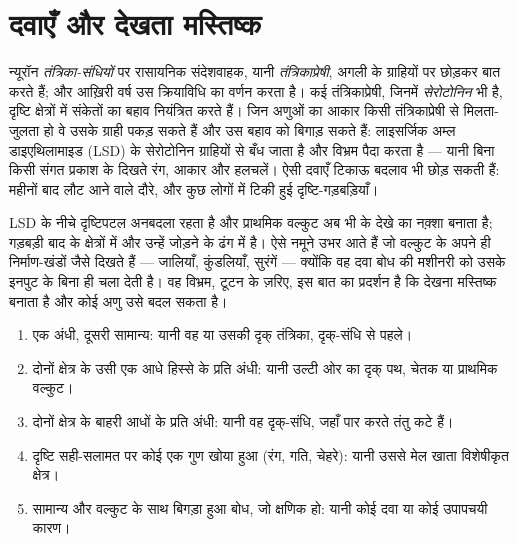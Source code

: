 \section{दवाएँ और देखता मस्तिष्क}

\begin{proposition}\label{prop:g11:vision-and-brain:drugs}
न्यूरॉन \emph{तंत्रिका-संधियों} पर रासायनिक संदेशवाहक, यानी
\emph{तंत्रिकाप्रेषी}, अगली  के ग्राहियों पर छोड़कर बात करते हैं; और
आख़िरी वर्ष उस क्रियाविधि का वर्णन करता है। कई तंत्रिकाप्रेषी, जिनमें
\emph{सेरोटोनिन} भी है, दृष्टि क्षेत्रों में संकेतों का बहाव नियंत्रित करते
हैं। जिन अणुओं का आकार किसी तंत्रिकाप्रेषी से मिलता-जुलता हो वे उसके ग्राही
पकड़ सकते हैं और उस बहाव को बिगाड़ सकते हैं: लाइसर्जिक अम्ल डाइएथिलामाइड
(LSD)  के सेरोटोनिन ग्राहियों से बँध जाता है और विभ्रम पैदा
करता है --- यानी बिना किसी संगत प्रकाश के दिखते रंग, आकार और हलचलें। ऐसी
दवाएँ टिकाऊ बदलाव भी छोड़ सकती हैं: महीनों बाद लौट आने वाले दौरे, और कुछ
लोगों में टिकी हुई दृष्टि-गड़बड़ियाँ।
\end{proposition}
\admitted

\begin{example}[कोई विभ्रम क्या दिखाता है]\label{ex:g11:vision-and-brain:hallucination}
LSD के नीचे दृष्टिपटल अनबदला रहता है और प्राथमिक वल्कुट अब भी  के देखे
का नक़्शा बनाता है; गड़बड़ी बाद के क्षेत्रों में और उन्हें जोड़ने के ढंग में
है। ऐसे नमूने उभर आते हैं जो वल्कुट के अपने ही निर्माण-खंडों जैसे दिखते हैं
--- जालियाँ, कुंडलियाँ, सुरंगें --- क्योंकि वह दवा बोध की मशीनरी को उसके
इनपुट के बिना ही चला देती है। वह विभ्रम, टूटन के ज़रिए, इस बात का प्रदर्शन
है कि देखना मस्तिष्क बनाता है और कोई अणु उसे बदल सकता है।
\end{example}

\begin{method}\label{met:g11:vision-and-brain:locate}
\begin{enumerate}
  \item एक  अंधी, दूसरी सामान्य: यानी वह  या उसकी दृक् तंत्रिका,
        दृक्-संधि से पहले।
  \item दोनों  क्षेत्र के उसी एक आधे हिस्से के प्रति अंधी: यानी उल्टी
        ओर का दृक् पथ, चेतक या प्राथमिक वल्कुट।
  \item दोनों  क्षेत्र के बाहरी आधों के प्रति अंधी: यानी वह दृक्-संधि, जहाँ
        पार करते तंतु कटे हैं।
  \item दृष्टि सही-सलामत पर कोई एक गुण खोया हुआ (रंग, गति, चेहरे): यानी
        उससे मेल खाता विशेषीकृत क्षेत्र।
  \item सामान्य  और वल्कुट के साथ बिगड़ा हुआ बोध, जो क्षणिक हो: यानी
        कोई दवा या कोई उपापचयी कारण।
\end{enumerate}
\end{method}

